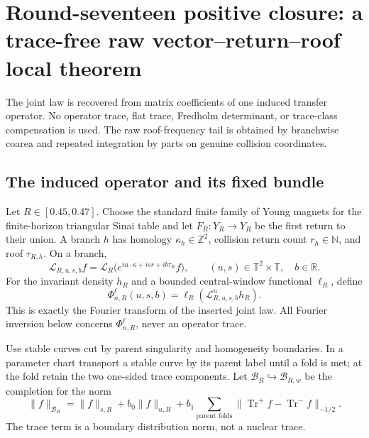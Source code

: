 \section{Round-seventeen positive closure: a trace-free raw vector--return--roof local theorem}
\label{sec:r17-a2}

The joint law is recovered from matrix coefficients of one induced transfer
operator.  No operator trace, flat trace, Fredholm determinant, or
trace-class compensation is used.  The raw roof-frequency tail is obtained by
branchwise coarea and repeated integration by parts on genuine collision
coordinates.

\subsection{The induced operator and its fixed bundle}

Let \(R\in[0.45,0.47]\).  Choose the standard finite family of Young magnets
for the finite-horizon triangular Sinai table and let
\(F_R:Y_R\to Y_R\) be the first return to their union.  A branch \(h\) has
homology \(\kappa_h\in\mathbb Z^2\), collision return count
\(r_h\in\mathbb N\), and roof \(\tau_{R,h}\).  On a branch,
\[
 \mathcal L_{R,u,s,b}f
 =\mathcal L_R\!\bigl(
 e^{i u\cdot\kappa+i s r+i b\tau_R}f\bigr),
 \qquad (u,s)\in\mathbb T^2\times\mathbb T,
 \quad b\in\mathbb R.
\]
For the invariant density \(h_R\) and a bounded central-window functional
\(\ell_R\), define
\[
 \Phi_{n,R}^{\ell}(u,s,b)
 =\ell_R(\mathcal L_{R,u,s,b}^{n}h_R).
\]
This is exactly the Fourier transform of the inserted joint law.  All Fourier
inversion below concerns \(\Phi_{n,R}^{\ell}\), never an operator trace.

Use stable curves cut by parent singularity and homogeneity boundaries.  In a
parameter chart transport a stable curve by its parent label until a fold is
met; at the fold retain the two one-sided trace components.  Let
\(\mathcal B_R\hookrightarrow\mathcal B_{R,w}\) be the completion for the
norm
\[
 \|f\|_{\mathcal B_R}
 =\|f\|_{s,R}+b_0\|f\|_{u,R}
   +b_1\sum_{\text{parent folds}}
       \|\operatorname{Tr}^{+}f-
          \operatorname{Tr}^{-}f\|_{-1/2}.
\]
The trace term is a boundary distribution norm, not a nuclear trace.


